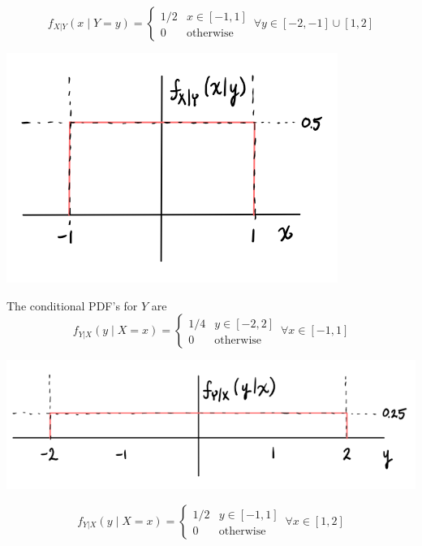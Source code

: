 \documentclass{article}
\begin{document}
$$ f_{X|Y}(x \mid Y = y) = \begin{cases}
    1/2 & x \in [-1, 1] \\
    0 & \mathrm{otherwise}
\end{cases}\, \forall y \in [-2, -1] \cup [1, 2] $$

\begin{center}
    \includegraphics[scale=0.5]{Images/P1Aiv.PNG}
\end{center}

The conditional PDF's for $Y$ are
$$ f_{Y|X}(y \mid X = x) = \begin{cases}
    1/4 & y \in [-2, 2] \\
    0 & \mathrm{otherwise}
\end{cases}\, \forall x \in [-1, 1] $$

\begin{center}
    \includegraphics[scale=0.5]{Images/P1Av.PNG}
\end{center}

$$ f_{Y|X}(y \mid X = x) = \begin{cases}
    1/2 & y \in [-1, 1] \\
    0 & \mathrm{otherwise}
\end{cases}\, \forall x \in [1, 2] $$
\end{document}
